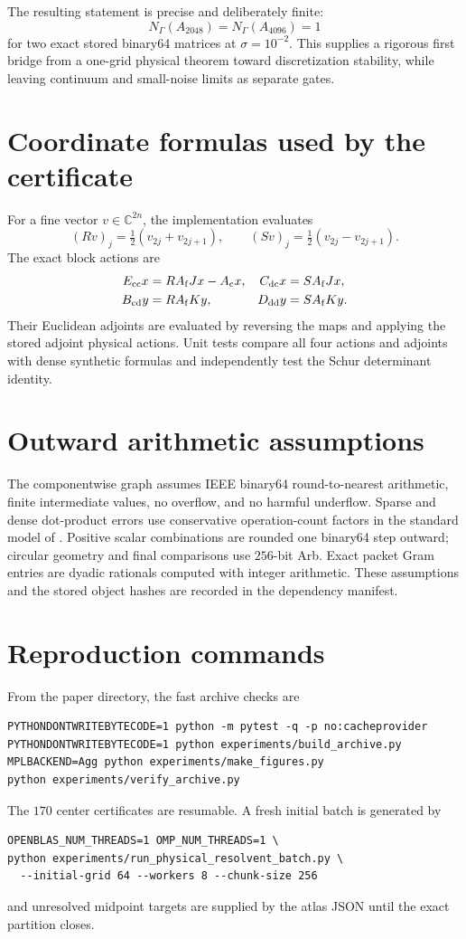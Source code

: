 \documentclass[11pt]{article}
\theoremstyle{definition}
\theoremstyle{remark}
\newcommand{\Ac}{A_{\mathrm c}}
\newcommand{\Af}{A_{\mathrm f}}
\newcommand{\GammaC}{\Gamma}
\begin{document}
The resulting statement is precise and deliberately finite:
\[
 N_{\GammaC}(A_{2048})=N_{\GammaC}(A_{4096})=1
\]
for two exact stored binary64 matrices at \(\sigma=10^{-2}\).  This supplies a
rigorous first bridge from a one-grid physical theorem toward discretization
stability, while leaving continuum and small-noise limits as separate gates.

\appendix

\section{Coordinate formulas used by the certificate}

For a fine vector \(v\in\mathbb C^{2n}\), the implementation evaluates
\[
 (Rv)_j=\tfrac12(v_{2j}+v_{2j+1}),\qquad
 (Sv)_j=\tfrac12(v_{2j}-v_{2j+1}).
\]
The exact block actions are
\begin{align*}
 E_{\rm cc}x&=R\Af Jx-\Ac x,&
 C_{\rm dc}x&=S\Af Jx,\\
 B_{\rm cd}y&=R\Af Ky,&
 D_{\rm dd}y&=S\Af Ky.
\end{align*}
Their Euclidean adjoints are evaluated by reversing the maps and applying the
stored adjoint physical actions.  Unit tests compare all four actions and
adjoints with dense synthetic formulas and independently test the Schur
determinant identity.

\section{Outward arithmetic assumptions}

The componentwise graph assumes IEEE binary64 round-to-nearest arithmetic,
finite intermediate values, no overflow, and no harmful underflow.  Sparse
and dense dot-product errors use conservative operation-count factors in the
standard model of \citet{Higham2002}.  Positive scalar combinations are
rounded one binary64 step outward; circular geometry and final comparisons
use \(256\)-bit Arb.  Exact packet Gram entries are dyadic rationals computed
with integer arithmetic.  These assumptions and the stored object hashes are
recorded in the dependency manifest.

\section{Reproduction commands}

From the paper directory, the fast archive checks are
\begin{verbatim}
PYTHONDONTWRITEBYTECODE=1 python -m pytest -q -p no:cacheprovider
PYTHONDONTWRITEBYTECODE=1 python experiments/build_archive.py
MPLBACKEND=Agg python experiments/make_figures.py
python experiments/verify_archive.py
\end{verbatim}
The \(170\) center certificates are resumable.  A fresh initial batch is
generated by
\begin{verbatim}
OPENBLAS_NUM_THREADS=1 OMP_NUM_THREADS=1 \
python experiments/run_physical_resolvent_batch.py \
  --initial-grid 64 --workers 8 --chunk-size 256
\end{verbatim}
and unresolved midpoint targets are supplied by the atlas JSON until the
exact partition closes.



\end{document}
